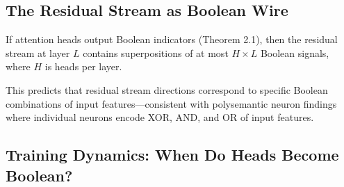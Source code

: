 \subsection{The Residual Stream as Boolean Wire}











\begin{lemma}





\label{lem:residual-quant}





If attention heads output Boolean indicators (Theorem 2.1), then the residual stream at layer $L$ contains superpositions of at most $H \times L$ Boolean signals, where $H$ is heads per layer.





\end{lemma}











This predicts that residual stream directions correspond to specific Boolean combinations of input features---consistent with polysemantic neuron findings where individual neurons encode XOR, AND, and OR of input features.











\subsection{Training Dynamics: When Do Heads Become Boolean?}











